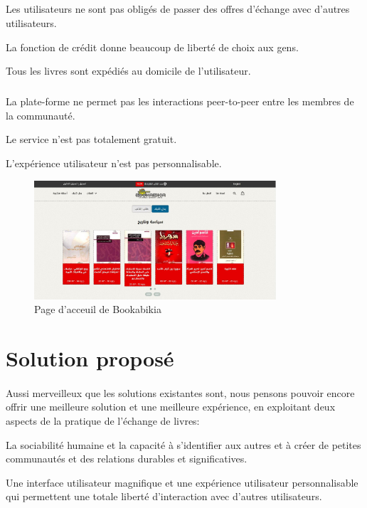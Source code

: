 \subparagraph*{}
\begin{list}{•}{\textbf{Avantages}}
	\item Les utilisateurs ne sont pas obligés de passer des offres d'échange avec d'autres utilisateurs.
	\item La fonction de crédit donne beaucoup de liberté de choix aux gens.
	\item Tous les livres sont expédiés au domicile de l'utilisateur.
\end{list}

\subparagraph*{}
\begin{list}{•}{\textbf{Inconvénients}}
	\item La plate-forme ne permet pas les interactions peer-to-peer entre les membres de la communauté.
	\item Le service n'est pas totalement gratuit.
	\item L'expérience utilisateur n'est pas personnalisable.
\end{list}

\begin{figure}[h]
	\begin{center}
		\includegraphics[width=9cm]{Images/chapter1/bookabikiaScreenshot.jpg}
		\caption{{\footnotesize Page d'acceuil de Bookabikia}}
	\end{center}
\end{figure}

\newpage
\section{Solution proposé}
\paragraph*{}
Aussi merveilleux que les solutions existantes sont, nous pensons pouvoir encore offrir une meilleure solution et une meilleure expérience, en exploitant deux aspects de la pratique de l'échange de livres:

\begin{list}{•}{}
	\item La sociabilité humaine et la capacité à s'identifier aux autres et à créer de petites communautés et des relations durables et significatives.
	\item Une interface utilisateur magnifique et une expérience utilisateur personnalisable qui permettent une totale liberté d'interaction avec d'autres utilisateurs.
\end{list}

